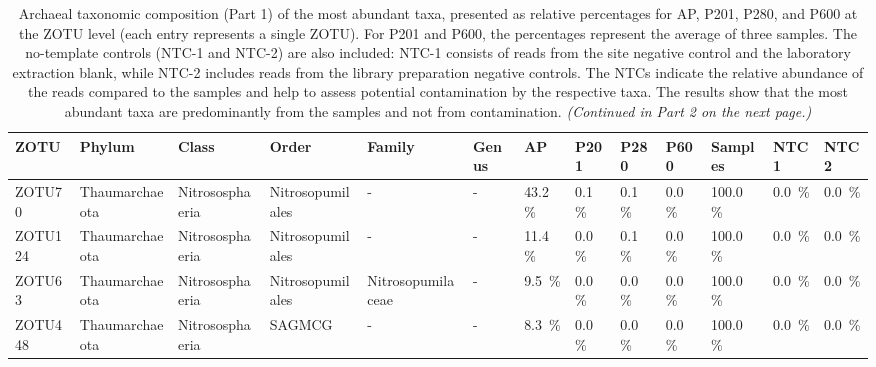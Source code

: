 \begin{table}  %
\centering
\begin{adjustbox}{max width=0.8\textwidth, max totalheight=0.85\textheight, keepaspectratio}
\renewcommand{\arraystretch}{1.5} %
\footnotesize %
\caption{Archaeal taxonomic composition (Part 1) of the most abundant taxa, presented as relative percentages for AP, P201, P280, and P600 at the ZOTU level (each entry represents a single ZOTU).
For P201 and P600, the percentages represent the average of three samples.
The no-template controls (NTC-1 and NTC-2) are also included: NTC-1 consists of reads from the site negative control and the laboratory extraction blank, while NTC-2 includes reads from the library preparation negative controls.
The NTCs indicate the relative abundance of the reads compared to the samples and help to assess potential contamination by the respective taxa.
The results show that the most abundant taxa are predominantly from the samples and not from contamination.
\textit{(Continued in Part 2 on the next page.)}}
\label{tabSI:tax_arc_1}
\begin{tabular}{llllllllll||lll}
\toprule
\textbf{ZOTU} & \textbf{Phylum} & \textbf{Class} & \textbf{Order} & \textbf{Family} & \textbf{Genus} & \textbf{AP} & \textbf{P201} & \textbf{P280} & \textbf{P600} & \textbf{Samples} & \textbf{NTC1} & \textbf{NTC2} \\
\midrule
ZOTU70 & Thaumarchaeota & Nitrososphaeria & Nitrosopumilales & - & - & \SI{43.2}{\percent} & \SI{0.1}{\percent} & \SI{0.1}{\percent} & \SI{0.0}{\percent} & \SI{100.0}{\percent} & \SI{0.0}{\percent} & \SI{0.0}{\percent} \\
ZOTU124 & Thaumarchaeota & Nitrososphaeria & Nitrosopumilales & - & - & \SI{11.4}{\percent} & \SI{0.0}{\percent} & \SI{0.1}{\percent} & \SI{0.0}{\percent} & \SI{100.0}{\percent} & \SI{0.0}{\percent} & \SI{0.0}{\percent} \\
ZOTU63 & Thaumarchaeota & Nitrososphaeria & Nitrosopumilales & Nitrosopumilaceae & - & \SI{9.5}{\percent} & \SI{0.0}{\percent} & \SI{0.0}{\percent} & \SI{0.0}{\percent} & \SI{100.0}{\percent} & \SI{0.0}{\percent} & \SI{0.0}{\percent} \\
ZOTU448 & Thaumarchaeota & Nitrososphaeria & SAGMCG & - & - & \SI{8.3}{\percent} & \SI{0.0}{\percent} & \SI{0.0}{\percent} & \SI{0.0}{\percent} & \SI{100.0}{\percent} & \SI{0.0}{\percent} & \SI{0.0}{\percent} \\

\end{tabular}
\end{adjustbox}
\end{table}
